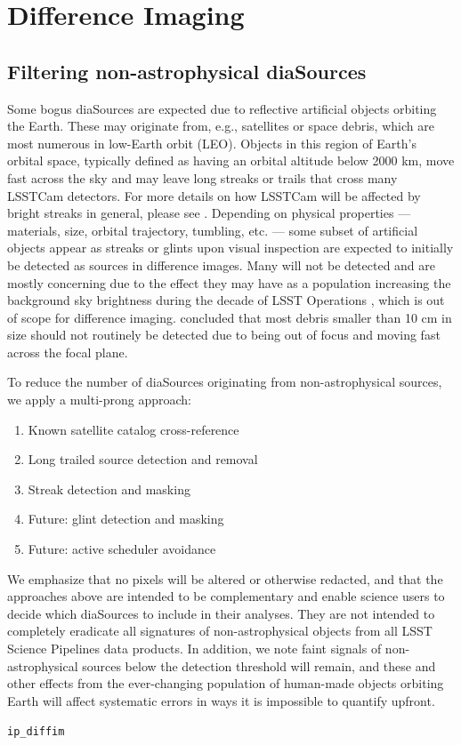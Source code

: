 \section{Difference Imaging}
\label{sec:diffim}

\subsection{Filtering non-astrophysical diaSources}

Some bogus diaSources are expected due to reflective artificial objects orbiting the Earth.
These may originate from, e.g., satellites or space debris, which are most numerous in low-Earth orbit (LEO).
Objects in this region of Earth's orbital space, typically defined as having an orbital altitude below 2000 km, move fast across the sky and may leave long streaks or trails that cross many LSSTCam detectors.
For more details on how LSSTCam will be affected by bright streaks in general, please see \citet{Tyson20,Hasan22,Polin24,Snyder24,Polin25}.
Depending on physical properties --- materials, size, orbital trajectory, tumbling, etc. --- some subset of artificial objects appear as streaks or glints upon visual inspection are expected to initially be detected as sources in difference images.
Many will not be detected and are mostly concerning due to the effect they may have as a population increasing the background sky brightness during the decade of LSST Operations \citep{Kocifaj21}, which is out of scope for difference imaging.
\citet{Tyson24} concluded that most debris smaller than 10 cm in size should not routinely be detected due to being out of focus and moving fast across the focal plane.

To reduce the number of diaSources originating from non-astrophysical sources, we apply a multi-prong approach:

\begin{enumerate}
\item Known satellite catalog cross-reference
\item Long trailed source detection and removal
\item Streak detection and masking
\item Future: glint detection and masking
\item Future: active scheduler avoidance \citep{Hu22}
\end{enumerate}

We emphasize that no pixels will be altered or otherwise redacted, and that the approaches above are intended to be complementary and enable science users to decide which diaSources to include in their analyses.
They are not intended to completely eradicate all signatures of non-astrophysical objects from all LSST Science Pipelines data products.
In addition, we note faint signals of non-astrophysical sources below the detection threshold will remain, and these and other effects from the ever-changing population of human-made objects orbiting Earth will affect systematic errors in ways it is impossible to quantify upfront.


\texttt{ip\_diffim}
